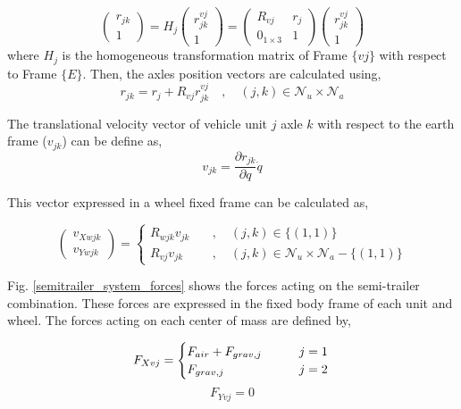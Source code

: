 \documentclass[12pt]{article}
\begin{document}
\begin{equation}
    \begin{pmatrix} r_{jk} \\ 1 \end{pmatrix} = H_{j} \begin{pmatrix} r_{jk}^{vj} \\ 1 \end{pmatrix} = \begin{pmatrix} R_{vj}  & r_j \\ \mathrm{0}_{1 \times 3} & 1 \end{pmatrix} \begin{pmatrix} r_{jk}^{vj} \\ 1 \end{pmatrix}
\end{equation}
where $H_j$ is the homogeneous transformation matrix of Frame $\{ vj \}$ with respect to Frame $\{ E \}$.  Then, the axles position vectors are calculated using,
\begin{equation}\label{Axles_position_eq}
    r_{jk} = r_j + R_{vj} r_{jk}^{vj} \quad , \quad (j,k) \in \mathcal{N}_u \times \mathcal{N}_a 
\end{equation}

The translational velocity vector of vehicle unit $j$ axle $k$ with respect to the earth frame ($v_{jk}$) can be define as,
\begin{equation}
    v_{jk} = \frac{\partial r_{jk}}{\partial q} \dot{q}
\end{equation}

This vector expressed in a wheel fixed frame can be calculated as,

\begin{equation}
    \begin{pmatrix} v_{Xwjk} \\ v_{Ywjk} \end{pmatrix} = \begin{cases} R_{wjk} v_{jk} \quad &, \quad (j,k) \in \{ (1,1) \} \\ R_{vj} v_{jk} \quad &, \quad (j,k) \in \mathcal{N}_u \times \mathcal{N}_a - \{ (1,1) \} \end{cases}
\end{equation}

Fig. \ref{semitrailer_system_forces} shows the forces acting on the semi-trailer combination. These forces are expressed in the fixed body frame of each unit and wheel. The forces acting on each center of mass are defined by,

\begin{equation}
        F_{Xvj} = \begin{cases} F_{air} + F_{grav,j} \qquad& j=1 \\ F_{grav,j} \qquad& j=2 \end{cases} \\
\end{equation}
\begin{equation}
    F_{Yvj} = 0
\end{equation}
\end{document}
